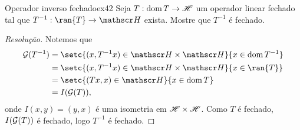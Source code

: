 \begin{exercício}{Operador inverso fechado}{ex42}
  Seja \(T : \operatorname{dom}{T} \to \mathscr{H}\) um operador linear fechado tal que \(T^{-1} : \ran{T} \to \hilbert\) exista. Mostre que \(T^{-1}\) é fechado.
\end{exercício}
\begin{proof}[Resolução]
  Notemos que
  \begin{align*}
    \graph{T^{-1}} &= \setc{(x, T^{-1}x) \in \hilbert \times \hilbert}{x \in \dom{T^{-1}}}\\
                   &= \setc{(x, T^{-1}x) \in \hilbert \times \hilbert}{x \in \ran{T}}\\
                   &= \setc{(Tx, x) \in \hilbert}{x \in \dom{T}}\\
                   &= I(\graph{T}),
  \end{align*}
  onde \(I(x,y) = (y,x)\) é uma isometria em \(\mathscr{H} \times \mathscr{H}\). Como \(T\) é fechado, \(I(\mathcal{G}(T))\) é fechado, logo \(T^{-1}\) é fechado.
\end{proof}
